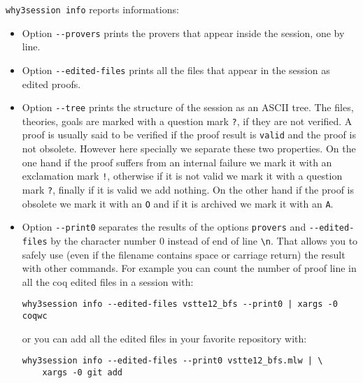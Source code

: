 \texttt{why3session info} reports informations:
\begin{itemize}
\item Option \verb|--provers| prints the provers that appear
  inside the session, one by line.
\item Option \verb|--edited-files| prints all the files that
  appear in the session as edited proofs.
\item Option \verb|--tree| prints the structure of the session as
  an ASCII tree. The files, theories, goals are marked with a question
  mark \verb|?|, if they are not verified. A proof is usually said to be verified
  if the proof result is \verb|valid| and the proof is not
  obsolete. However here specially
  we separate these two properties. On the one hand if the proof suffers from an internal
  failure we mark it with an exclamation mark \verb|!|, otherwise if
  it is not valid we mark it with a question mark \verb|?|, finally
  if it is valid we add nothing. On the other hand if the proof is obsolete we mark it
  with an \verb|O| and if it is archived we mark it with an
  \verb|A|.
\item Option \verb|--print0| separates the results of the options
  \verb|provers| and \verb|--edited-files| by the character number
  0 instead of end of line \verb|\n|. That allows you to
  safely use (even if the filename contains space or carriage return)
  the result with other commands. For example you can count the number
  of proof line in all the coq edited files in a session with:
\begin{verbatim}
why3session info --edited-files vstte12_bfs --print0 | xargs -0 coqwc
\end{verbatim}
  or you can add all the edited files in your favorite repository
  with:
\begin{verbatim}
why3session info --edited-files --print0 vstte12_bfs.mlw | \
    xargs -0 git add
\end{verbatim}

\end{itemize}

